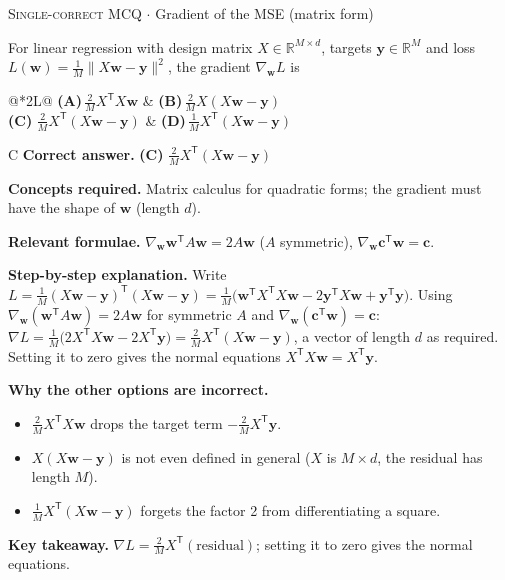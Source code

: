 \documentclass[11pt,a4paper]{article}
\newcommand{\optlabel}[1]{\textbf{(#1)}}
\newcommand{\correctlabel}[1]{\textcolor{okgreen}{\textbf{(#1)}\,\ding{51}}}
\newenvironment{qitem}[1]{\begin{list}{}{\setlength{\leftmargin}{3.3em}\setlength{\labelwidth}{3.1em}%
  \setlength{\labelsep}{0.2em}\setlength{\topsep}{3pt}\setlength{\parsep}{3pt}}\item[\textbf{Q.#1}\hfill]}{\end{list}}
\newcommand{\qsep}{\par\vspace{2pt}{\color{black!15}\hrule}\vspace{4pt}}
\newcommand{\qmeta}[2]{{\footnotesize\color{black!60}\textsc{#1} \;$\cdot$\; #2}\par}
\begin{document}
\begin{qitem}{13}
\qmeta{Single-correct MCQ}{Gradient of the MSE (matrix form)}
For linear regression with design matrix $X \in \mathbb R^{M\times d}$, targets $\mathbf y \in \mathbb R^M$ and
loss $L(\mathbf w) = \frac1M\|X\mathbf w - \mathbf y\|^2$, the gradient $\nabla_{\mathbf w}L$ is
\par\smallskip\noindent\begin{tabularx}{\linewidth}{@{}*{2}{L}@{}}
\optlabel{A}\,$\frac2M X^{\mathsf T}X\mathbf w$ & \optlabel{B}\,$\frac2M X(X\mathbf w - \mathbf y)$ \\[3pt]
\correctlabel{C}\,$\frac2M X^{\mathsf T}(X\mathbf w - \mathbf y)$ & \optlabel{D}\,$\frac1M X^{\mathsf T}(X\mathbf w - \mathbf y)$
\end{tabularx}
\end{qitem}
\begin{solbox}{C}
\textbf{\color{brand}Correct answer.} \textcolor{okgreen}{\textbf{(C)}} $\frac2M X^{\mathsf T}(X\mathbf w - \mathbf y)$

\textbf{\color{brand}Concepts required.} Matrix calculus for quadratic forms; the gradient must have the shape of $\mathbf w$ (length $d$).

\textbf{\color{brand}Relevant formulae.} $\nabla_{\mathbf w}\mathbf w^{\mathsf T}A\mathbf w = 2A\mathbf w$ ($A$ symmetric), $\nabla_{\mathbf w}\mathbf c^{\mathsf T}\mathbf w = \mathbf c$.

\textbf{\color{brand}Step-by-step explanation.} Write $L = \frac1M(X\mathbf w - \mathbf y)^{\mathsf T}(X\mathbf w - \mathbf y)
= \frac1M\big(\mathbf w^{\mathsf T}X^{\mathsf T}X\mathbf w - 2\mathbf y^{\mathsf T}X\mathbf w + \mathbf y^{\mathsf T}\mathbf y\big)$.
Using $\nabla_{\mathbf w}(\mathbf w^{\mathsf T}A\mathbf w) = 2A\mathbf w$ for symmetric $A$ and $\nabla_{\mathbf w}(\mathbf c^{\mathsf T}\mathbf w) = \mathbf c$:
$\nabla L = \frac1M\big(2X^{\mathsf T}X\mathbf w - 2X^{\mathsf T}\mathbf y\big) = \frac2M X^{\mathsf T}(X\mathbf w - \mathbf y)$,
a vector of length $d$ as required. Setting it to zero gives the normal equations $X^{\mathsf T}X\mathbf w = X^{\mathsf T}\mathbf y$.

\textbf{\color{brand}Why the other options are incorrect.}
\begin{itemize}[leftmargin=2.4em, itemsep=1pt, topsep=2pt]
\item[\textbf{(A)}] $\frac2M X^{\mathsf T}X\mathbf w$ drops the target term $-\frac2M X^{\mathsf T}\mathbf y$.
\item[\textbf{(B)}] $X(X\mathbf w - \mathbf y)$ is not even defined in general ($X$ is $M\times d$, the residual has length $M$).
\item[\textbf{(D)}] $\frac1M X^{\mathsf T}(X\mathbf w - \mathbf y)$ forgets the factor 2 from differentiating a square.
\end{itemize}
\textbf{\color{brand}Key takeaway.} $\nabla L = \frac2M X^{\mathsf T}(\text{residual})$; setting it to zero gives the normal equations.
\end{solbox}
\qsep
\end{document}
